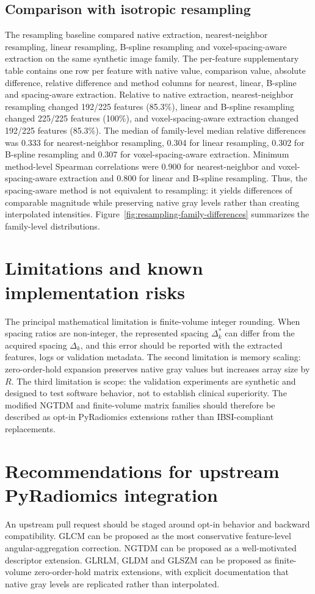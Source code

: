 \documentclass[11pt]{article}
\begin{document}
\subsection{Comparison with isotropic resampling}
The resampling baseline compared native extraction, nearest-neighbor resampling, linear resampling, B-spline resampling and voxel-spacing-aware extraction on the same synthetic image family. The per-feature supplementary table contains one row per feature with native value, comparison value, absolute difference, relative difference and method columns for nearest, linear, B-spline and spacing-aware extraction. Relative to native extraction, nearest-neighbor resampling changed 192/225 features (85.3\%), linear and B-spline resampling changed 225/225 features (100\%), and voxel-spacing-aware extraction changed 192/225 features (85.3\%). The median of family-level median relative differences was 0.333 for nearest-neighbor resampling, 0.304 for linear resampling, 0.302 for B-spline resampling and 0.307 for voxel-spacing-aware extraction. Minimum method-level Spearman correlations were 0.900 for nearest-neighbor and voxel-spacing-aware extraction and 0.800 for linear and B-spline resampling. Thus, the spacing-aware method is not equivalent to resampling: it yields differences of comparable magnitude while preserving native gray levels rather than creating interpolated intensities. Figure~\ref{fig:resampling-family-differences} summarizes the family-level distributions.

\section{Limitations and known implementation risks}
The principal mathematical limitation is finite-volume integer rounding. When spacing ratios are non-integer, the represented spacing \(\Delta_k^{*}\) can differ from the acquired spacing \(\Delta_k\), and this error should be reported with the extracted features, logs or validation metadata. The second limitation is memory scaling: zero-order-hold expansion preserves native gray values but increases array size by \(R\). The third limitation is scope: the validation experiments are synthetic and designed to test software behavior, not to establish clinical superiority. The modified NGTDM and finite-volume matrix families should therefore be described as opt-in PyRadiomics extensions rather than IBSI-compliant replacements.

\section{Recommendations for upstream PyRadiomics integration}
An upstream pull request should be staged around opt-in behavior and backward compatibility. GLCM can be proposed as the most conservative feature-level angular-aggregation correction. NGTDM can be proposed as a well-motivated descriptor extension. GLRLM, GLDM and GLSZM can be proposed as finite-volume zero-order-hold matrix extensions, with explicit documentation that native gray levels are replicated rather than interpolated.
\end{document}
